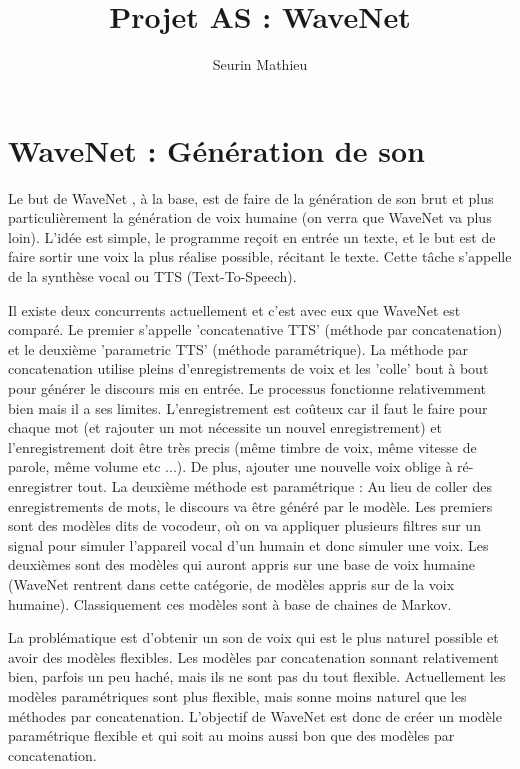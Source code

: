 \documentclass[a4paper]{article}
\title{Projet AS : WaveNet}
\author{Seurin Mathieu}
\begin{document}
\maketitle

\section{WaveNet : Génération de son}

Le but de WaveNet \cite{wavenet}, à la base, est de faire de la génération de son brut et plus particulièrement la génération de voix humaine (on verra que WaveNet va plus loin). L'idée est simple, le programme reçoit en entrée un texte, et le but est de faire sortir une voix la plus réalise possible, récitant le texte. Cette tâche s'appelle de la synthèse vocal ou TTS (Text-To-Speech).

Il existe deux concurrents actuellement et c'est avec eux que WaveNet est comparé. Le premier s'appelle 'concatenative TTS' (méthode par concatenation) et le deuxième 'parametric TTS' (méthode paramétrique). La méthode par concatenation utilise pleins d'enregistrements de voix et les 'colle' bout à bout pour générer le discours mis en entrée. Le processus fonctionne relativemment bien mais il a ses limites. L'enregistrement est coûteux car il faut le faire pour chaque mot (et rajouter un mot nécessite un nouvel enregistrement) et l'enregistrement doit être très precis (même timbre de voix, même vitesse de parole, même volume etc ...). De plus, ajouter une nouvelle voix oblige à ré-enregistrer tout. La deuxième méthode est paramétrique : Au lieu de coller des enregistrements de mots, le discours va être généré par le modèle. Les premiers sont des modèles dits de vocodeur, où on va appliquer plusieurs filtres sur un signal pour simuler l'appareil vocal d'un humain et donc simuler une voix.
Les deuxièmes sont des modèles qui auront appris sur une base de voix humaine (WaveNet rentrent dans cette catégorie, de modèles appris sur de la voix humaine). Classiquement ces modèles sont à base de chaines de Markov.

La problématique est d'obtenir un son de voix qui est le plus naturel possible et avoir des modèles flexibles. Les modèles par concatenation sonnant relativement bien, parfois un peu haché, mais ils ne sont pas du tout flexible. Actuellement les modèles paramétriques sont plus flexible, mais sonne moins naturel que les méthodes par concatenation.
L'objectif de WaveNet est donc de créer un modèle paramétrique flexible et qui soit au moins aussi bon que des modèles par concatenation.
\end{document}
